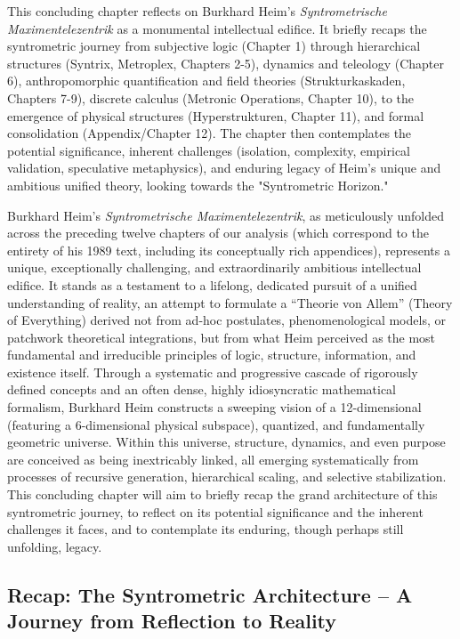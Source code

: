 \documentclass[12pt]{article}
\begin{document}
This concluding chapter reflects on Burkhard Heim’s \textit{Syntrometrische Maximentelezentrik} as a monumental intellectual edifice. It briefly recaps the syntrometric journey from subjective logic (Chapter 1) through hierarchical structures (Syntrix, Metroplex, Chapters 2-5), dynamics and teleology (Chapter 6), anthropomorphic quantification and field theories (Strukturkaskaden, Chapters 7-9), discrete calculus (Metronic Operations, Chapter 10), to the emergence of physical structures (Hyperstrukturen, Chapter 11), and formal consolidation (Appendix/Chapter 12). The chapter then contemplates the potential significance, inherent challenges (isolation, complexity, empirical validation, speculative metaphysics), and enduring legacy of Heim's unique and ambitious unified theory, looking towards the "Syntrometric Horizon."

Burkhard Heim’s \textit{Syntrometrische Maximentelezentrik}, as meticulously unfolded across the preceding twelve chapters of our analysis (which correspond to the entirety of his 1989 text, including its conceptually rich appendices), represents a unique, exceptionally challenging, and extraordinarily ambitious intellectual edifice. It stands as a testament to a lifelong, dedicated pursuit of a unified understanding of reality, an attempt to formulate a \enquote{Theorie von Allem} (Theory of Everything) derived not from ad-hoc postulates, phenomenological models, or patchwork theoretical integrations, but from what Heim perceived as the most fundamental and irreducible principles of logic, structure, information, and existence itself. Through a systematic and progressive cascade of rigorously defined concepts and an often dense, highly idiosyncratic mathematical formalism, Burkhard Heim constructs a sweeping vision of a 12-dimensional (featuring a 6-dimensional physical subspace), quantized, and fundamentally geometric universe. Within this universe, structure, dynamics, and even purpose are conceived as being inextricably linked, all emerging systematically from processes of recursive generation, hierarchical scaling, and selective stabilization. This concluding chapter will aim to briefly recap the grand architecture of this syntrometric journey, to reflect on its potential significance and the inherent challenges it faces, and to contemplate its enduring, though perhaps still unfolding, legacy.

\subsection{Recap: The Syntrometric Architecture – A Journey from Reflection to Reality}
\label{sec:recap_architecture}
\end{document}
